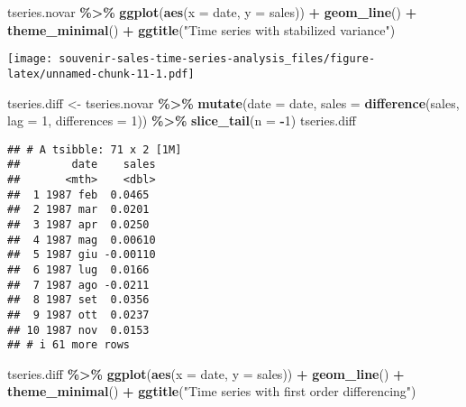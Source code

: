 \documentclass[
]{article}
\newenvironment{Shaded}{\begin{snugshade}}{\end{snugshade}}
\newcommand{\AttributeTok}[1]{\textcolor[rgb]{0.13,0.29,0.53}{#1}}
\newcommand{\DecValTok}[1]{\textcolor[rgb]{0.00,0.00,0.81}{#1}}
\newcommand{\FunctionTok}[1]{\textcolor[rgb]{0.13,0.29,0.53}{\textbf{#1}}}
\newcommand{\NormalTok}[1]{#1}
\newcommand{\OtherTok}[1]{\textcolor[rgb]{0.56,0.35,0.01}{#1}}
\newcommand{\SpecialCharTok}[1]{\textcolor[rgb]{0.81,0.36,0.00}{\textbf{#1}}}
\newcommand{\StringTok}[1]{\textcolor[rgb]{0.31,0.60,0.02}{#1}}
\begin{document}
\begin{Shaded}
\begin{Highlighting}[]
\NormalTok{tseries.novar }\SpecialCharTok{\%\textgreater{}\%} \FunctionTok{ggplot}\NormalTok{(}\FunctionTok{aes}\NormalTok{(}\AttributeTok{x =}\NormalTok{ date, }\AttributeTok{y =}\NormalTok{ sales)) }\SpecialCharTok{+}
  \FunctionTok{geom\_line}\NormalTok{() }\SpecialCharTok{+}
  \FunctionTok{theme\_minimal}\NormalTok{() }\SpecialCharTok{+}
  \FunctionTok{ggtitle}\NormalTok{(}\StringTok{"Time series with stabilized variance"}\NormalTok{)}
\end{Highlighting}
\end{Shaded}

\texttt{[image: souvenir-sales-time-series-analysis\_files/figure-latex/unnamed-chunk-11-1.pdf]}

\begin{Shaded}
\begin{Highlighting}[]
\NormalTok{tseries.diff }\OtherTok{\textless{}{-}}\NormalTok{ tseries.novar }\SpecialCharTok{\%\textgreater{}\%}
  \FunctionTok{mutate}\NormalTok{(}\AttributeTok{date =}\NormalTok{ date, }\AttributeTok{sales =} \FunctionTok{difference}\NormalTok{(sales, }\AttributeTok{lag =} \DecValTok{1}\NormalTok{, }\AttributeTok{differences =} \DecValTok{1}\NormalTok{)) }\SpecialCharTok{\%\textgreater{}\%}
  \FunctionTok{slice\_tail}\NormalTok{(}\AttributeTok{n =} \SpecialCharTok{{-}}\DecValTok{1}\NormalTok{)}
\NormalTok{tseries.diff}
\end{Highlighting}
\end{Shaded}

\begin{verbatim}
## # A tsibble: 71 x 2 [1M]
##        date    sales
##       <mth>    <dbl>
##  1 1987 feb  0.0465 
##  2 1987 mar  0.0201 
##  3 1987 apr  0.0250 
##  4 1987 mag  0.00610
##  5 1987 giu -0.00110
##  6 1987 lug  0.0166 
##  7 1987 ago -0.0211 
##  8 1987 set  0.0356 
##  9 1987 ott  0.0237 
## 10 1987 nov  0.0153 
## # i 61 more rows
\end{verbatim}

\begin{Shaded}
\begin{Highlighting}[]
\NormalTok{tseries.diff }\SpecialCharTok{\%\textgreater{}\%}
  \FunctionTok{ggplot}\NormalTok{(}\FunctionTok{aes}\NormalTok{(}\AttributeTok{x =}\NormalTok{ date, }\AttributeTok{y =}\NormalTok{ sales)) }\SpecialCharTok{+}
  \FunctionTok{geom\_line}\NormalTok{() }\SpecialCharTok{+}
  \FunctionTok{theme\_minimal}\NormalTok{() }\SpecialCharTok{+}
  \FunctionTok{ggtitle}\NormalTok{(}\StringTok{"Time series with first order differencing"}\NormalTok{)}
\end{Highlighting}
\end{Shaded}
\end{document}
